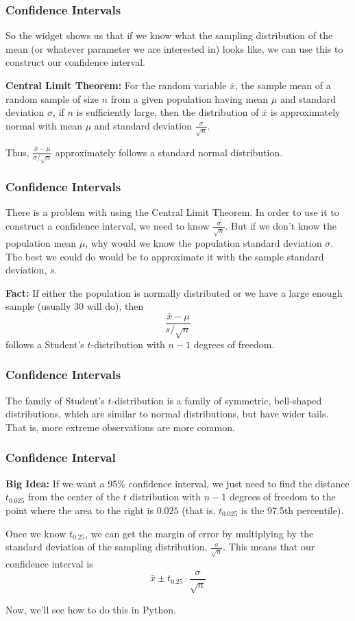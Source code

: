 \documentclass[11pt, table]{beamer}
\newcommand{\p}{\pause}
\begin{document}
\begin{frame}
\frametitle{Confidence Intervals}
So the widget shows us that if we know what the sampling distribution of the mean (or whatever parameter we are interested in) looks like, we can use this to construct our confidence interval. \p
\vspace{0.2in}

\textbf{Central Limit Theorem:} For the random variable $\bar{x}$, the sample mean of a random sample of size $n$ from a given population having mean $\mu$ and standard deviation $\sigma$, if $n$ is sufficiently large, then the distribution of $\bar{x}$ is approximately normal with mean $\mu$ and standard deviation $\frac{\sigma}{\sqrt{n}}$.
\vspace{0.2in}

Thus, $\frac{\bar{x} - \mu}{\sigma / \sqrt{n}}$ approximately follows a standard normal distribution.
\end{frame}

\begin{frame}
\frametitle{Confidence Intervals}
There is a problem with using the Central Limit Theorem. In order to use it to construct a confidence interval, we need to know $\frac{\sigma}{\sqrt{n}}$. But if we don't know the population mean $\mu$, why would we know the population standard deviation $\sigma$. The best we could do would be to approximate it with the sample standard deviation, $s$. 
\vspace{0.2in}

\textbf{Fact:} If either the population is normally distributed or we have a large enough sample (usually 30 will do), then 
$$\frac{\bar{x} - \mu}{s / \sqrt{n}}$$
follows a Student's $t$-distribution with $n-1$ degrees of freedom.
\end{frame}

\begin{frame}
\frametitle{Confidence Intervals}
The family of Student's $t$-distribution is a family of symmetric, bell-shaped distributions, which are similar to normal distributions, but have wider tails. That is, more extreme observations are more common.
\vspace{0.2in}
\end{frame}

\begin{frame}
\frametitle{Confidence Interval}
\textbf{Big Idea:} If we want a 95\% confidence interval, we just need to find the distance $t_{0.025}$ from the center of the $t$ distribution with $n-1$ degrees of freedom to the point where the area to the right is $0.025$ (that is, $t_{0.025}$ is the 97.5th percentile).
\vspace{0.1in}

Once we know $t_{0.25}$, we can get the margin of error by multiplying by the standard deviation of the sampling distribution, $\frac{\sigma}{\sqrt{n}}$. This means that our confidence interval is
$$\bar{x} \pm t_{0.25}\cdot\frac{\sigma}{\sqrt{n}}$$

Now, we'll see how to do this in Python.
\end{frame}
\end{document}
